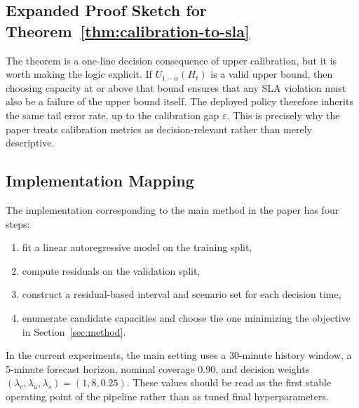 \documentclass[11pt]{article}
\theoremstyle{plain}
\theoremstyle{definition}
\theoremstyle{remark}
\begin{document}
\subsection{Expanded Proof Sketch for Theorem~\ref{thm:calibration-to-sla}}
The theorem is a one-line decision consequence of upper calibration, but it is worth making the logic explicit. If $U_{1-\alpha}(H_t)$ is a valid upper bound, then choosing capacity at or above that bound ensures that any SLA violation must also be a failure of the upper bound itself. The deployed policy therefore inherits the same tail error rate, up to the calibration gap $\varepsilon$. This is precisely why the paper treats calibration metrics as decision-relevant rather than merely descriptive.

\subsection{Implementation Mapping}
The implementation corresponding to the main method in the paper has four steps:
\begin{enumerate}[leftmargin=1.2cm]
    \item fit a linear autoregressive model on the training split,
    \item compute residuals on the validation split,
    \item construct a residual-based interval and scenario set for each decision time,
    \item enumerate candidate capacities and choose the one minimizing the objective in Section~\ref{sec:method}.
\end{enumerate}
In the current experiments, the main setting uses a 30-minute history window, a 5-minute forecast horizon, nominal coverage $0.90$, and decision weights $(\lambda_c,\lambda_u,\lambda_s)=(1,8,0.25)$. These values should be read as the first stable operating point of the pipeline rather than as tuned final hyperparameters.
\end{document}
